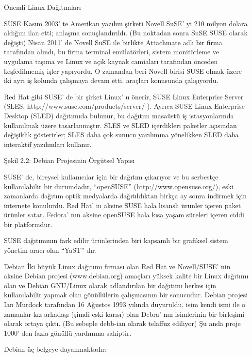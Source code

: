 \begin{section}{Önemli Linux Dağıtımları}
\begin{subsection}{SUSE}
Kasım 2003' te Amerikan yazılım şirketi Novell SuSE' yi 210 milyon dolara aldığını ilan etti; anlaşma sonuçlandırıldı. (Bu noktadan sonra SuSE SUSE olarak değişti) Nisan 2011' de Novell SuSE ile birlikte Attachmate adlı bir firma tarafından alındı, bu firma terminal emülatörleri, sistem monitörleme ve uygulama taşıma ve Linux ve açık kaynak camiaları tarafından önceden keşfedilmemiş işler yapıyordu. O zamandan beri Novell birisi SUSE olmak üzere iki ayrı iş kolunda çalışmaya devam etti. araçları konusunda çalışıyordu.

Red Hat gibi SUSE' de bir şirket Linux' u önerir, SUSE Linux Enterprise Server (SLES, http://www.suse.com/products/server/ ). Ayrıca SUSE Linux Enterprise Desktop (SLED) dağıtımıda bulunur, bu dağıtım masaüstü iş istasyonlarında kullanılmak üzere tasarlanmıştır. SLES ve SLED içerdikleri paketler açısından değişiklik gösterirler; SLES daha çok sunucu yazılımına yönelikken SLED daha interaktif yazılımları kullanır.

Şekil 2.2: Debian Projesinin Örgütsel Yapısı

SUSE' de, bireysel kullanıcılar için bir dağıtım çıkarıyor ve bu serbestçe kullanılabilir bir durumdadır, “openSUSE” (http://www.opensuse.org/), eski zamanlarda dağıtım optik medyalarda dağıtıldıktan birkça ay sonra indirmek için internete konulurdu. Red Hat' in aksine SUSE hala lisanslı ürünler içeren paket ürünler satar. Fedora' nın aksine openSUSE hala kısa yaşam süreleri içeren ciddi bir platformdur.

SUSE dağıtımının fark edilir ürünlerinden biri kapsamlı bir grafiksel sistem yönetim aracı olan “YaST” dır.

\end{subsection}
\begin{subsection}{Debian}
\label{sec:bolum244}
İki büyük Linux dağıtımı firması olan Red Hat ve Novell/SUSE' nin aksine Debian projesi (www.debian.org) amaçları yüksek kalite bir Linux dağıtımı olan ve Debian GNU/Linux olarak adlandırılan bir dağıtımı herkes için kullanılabilir yapmak olan gönüllülerin çalışmasının bir sonucudur. Debian projesi Ian Murdock tarafından 16 Ağustos 1993 yılında duyuruldu, isim kendi ismi ile o zamanlar kız arkadaşı (şimdi eski karısı) olan Debra' nın isimlerinin bir birleşimi olarak ortaya çıktı. (Bu sebeple debb-ian olarak telaffuz ediliyor) Şu anda proje 1000' den fazla gönüllü yardımına sahiptir.

Debian üç belgeye dayanmaktadır:


\end{subsection}
\end{section}
